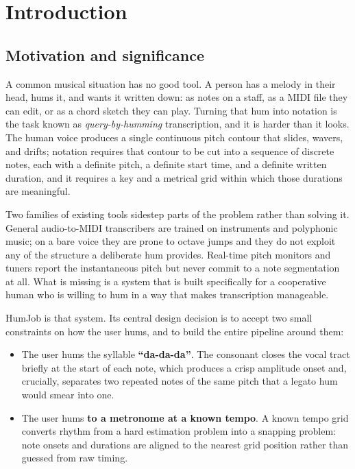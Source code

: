 \documentclass[12pt,a4paper]{article}
\begin{document}
\newpage
{}
\tableofcontents
\newpage
\listoffigures
\newpage
\listoftables
\newpage

\section{Introduction}

\subsection{Motivation and significance}

A common musical situation has no good tool. A person has a melody in their
head, hums it, and wants it written down: as notes on a staff, as a MIDI file
they can edit, or as a chord sketch they can play. Turning that hum into
notation is the task known as \emph{query-by-humming} transcription, and it is
harder than it looks. The human voice produces a single continuous pitch
contour that slides, wavers, and drifts; notation requires that contour to be
cut into a sequence of discrete notes, each with a definite pitch, a definite
start time, and a definite written duration, and it requires a key and a
metrical grid within which those durations are meaningful.

Two families of existing tools sidestep parts of the problem rather than
solving it. General audio-to-MIDI transcribers are trained on instruments and
polyphonic music; on a bare voice they are prone to octave jumps and they do
not exploit any of the structure a deliberate hum provides. Real-time pitch
monitors and tuners report the instantaneous pitch but never commit to a note
segmentation at all. What is missing is a system that is built specifically for
a cooperative human who is willing to hum in a way that makes transcription
manageable.

HumJob is that system. Its central design decision is to accept two small
constraints on how the user hums, and to build the entire pipeline around them:

\begin{itemize}
    \item The user hums the syllable \textbf{``da-da-da''}. The consonant
    closes the vocal tract briefly at the start of each note, which produces a
    crisp amplitude onset and, crucially, separates two repeated notes of the
    same pitch that a legato hum would smear into one.
    \item The user hums \textbf{to a metronome at a known tempo}. A known
    tempo grid converts rhythm from a hard estimation problem into a snapping
    problem: note onsets and durations are aligned to the nearest grid
    position rather than guessed from raw timing.
\end{itemize}
\end{document}
